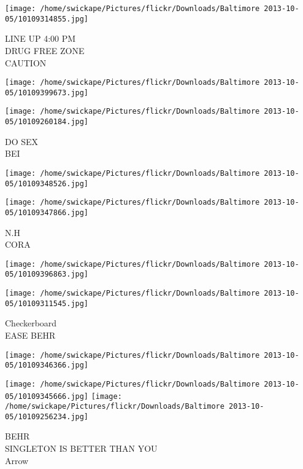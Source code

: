 \documentclass[10pt,letterpaper]{article}
\begin{document}
\texttt{[image: /home/swickape/Pictures/flickr/Downloads/Baltimore 2013-10-05/10109314855.jpg]}

LINE UP 4:00 PM\\
DRUG FREE ZONE\\
CAUTION\\
\pagebreak

\texttt{[image: /home/swickape/Pictures/flickr/Downloads/Baltimore 2013-10-05/10109399673.jpg]}

\vspace{0.25in}
\texttt{[image: /home/swickape/Pictures/flickr/Downloads/Baltimore 2013-10-05/10109260184.jpg]}

DO SEX\\
BEI\\
\pagebreak

\texttt{[image: /home/swickape/Pictures/flickr/Downloads/Baltimore 2013-10-05/10109348526.jpg]}

\vspace{0.25in}
\texttt{[image: /home/swickape/Pictures/flickr/Downloads/Baltimore 2013-10-05/10109347866.jpg]}

N.H\\
CORA\\
\pagebreak

\texttt{[image: /home/swickape/Pictures/flickr/Downloads/Baltimore 2013-10-05/10109396863.jpg]}

\vspace{0.25in}
\texttt{[image: /home/swickape/Pictures/flickr/Downloads/Baltimore 2013-10-05/10109311545.jpg]}

Checkerboard\\
EASE BEHR\\
\pagebreak

\texttt{[image: /home/swickape/Pictures/flickr/Downloads/Baltimore 2013-10-05/10109346366.jpg]}

\vspace{0.25in}
\texttt{[image: /home/swickape/Pictures/flickr/Downloads/Baltimore 2013-10-05/10109345666.jpg]}
\texttt{[image: /home/swickape/Pictures/flickr/Downloads/Baltimore 2013-10-05/10109256234.jpg]}

BEHR\\
SINGLETON IS BETTER THAN YOU\\
Arrow\\
\pagebreak
\end{document}
